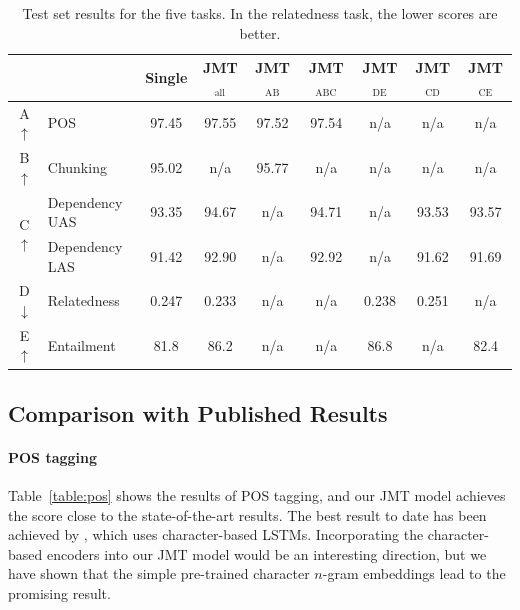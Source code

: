 \documentclass[11pt,a4paper]{article}
\begin{document}
\begin{table}[t]
  \begin{center}
{\small
	\begin{tabular}{cl|c|c|ccccc}
	  &             & Single   & JMT$_{\mathrm{all}}$ & JMT$_{\mathrm{AB}}$  & JMT$_{\mathrm{ABC}}$  & JMT$_{\mathrm{DE}}$ & JMT$_{\mathrm{CD}}$ & JMT$_{\mathrm{CE}}$ \\ \hline
	A $\uparrow$ & POS          &  97.45   & 97.55   & 97.52  & 97.54 & n/a & n/a & n/a \\ \hline
	B $\uparrow$ & Chunking &     95.02   &  n/a & 95.77  & n/a & n/a & n/a & n/a \\ \hline
	\multirow{2}{*}{C $\uparrow$}
	& Dependency UAS&          93.35 & 94.67  & n/a          & 94.71 & n/a & 93.53 &  93.57  \\
	& Dependency LAS&          91.42  & 92.90  & n/a         & 92.92 & n/a & 91.62 &  91.69 \\ \hline
	D $\downarrow$ & Relatedness & 0.247 &  0.233 & n/a & n/a & 0.238 & 0.251  & n/a \\ \hline
	E $\uparrow$ & Entailment  & 81.8  &  86.2  & n/a & n/a & 86.8 & n/a & 82.4 \\ \hline
  \end{tabular}
}
    \caption{Test set results for the five tasks.
    		 In the relatedness task, the lower scores are better.}
    \label{table:main}
  \end{center}
\end{table}

\subsection{Comparison with Published Results}

\paragraph{POS tagging}
Table~\ref{table:pos} shows the results of POS tagging, and our JMT model achieves the score close to the state-of-the-art results.
The best result to date has been achieved by \citet{ling2015charlstm}, which uses character-based LSTMs.
Incorporating the character-based encoders into our JMT model would be an interesting direction, but we have shown that the simple pre-trained character $n$-gram embeddings lead to the promising result.
\end{document}
